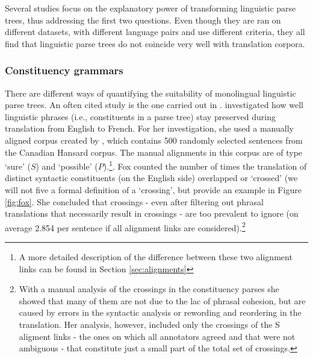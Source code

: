 \documentclass{report}
\theoremstyle{definition}
\theoremstyle{plain}
\begin{document}
Several studies focus on the explanatory power of transforming linguistic parse trees, thus addressing the first two questions. Even though they are ran on different datasets, with different language pairs and use different criteria, they all find that linguistic parse trees do not coincide very well with translation corpora.

\subsubsection{Constituency grammars}

There are different ways of quantifying the suitability of monolingual linguistic parse trees. An often cited study is the one carried out in \cite{fox2002phrasal}. \citeauthor{fox2002phrasal} investigated how well linguistic phrases (i.e., constituents in a parse tree) stay preserved during translation from English to French. For her investigation, she used a manually aligned corpus created by \cite{och2000improved}, which contains 500 randomly selected sentences from the Canadian Hansard corpus. The manual alignments in this corpus are of type `sure' ($S$) and `possible' ($P$).\footnote{A more detailed description of the difference between these two alignment links can be found in Section \ref{sec:alignments}}. Fox counted the number of times the translation of distinct syntactic constituents (on the English side) overlapped or `crossed' (we will not five a formal definition of a `crossing', but provide an example in Figure \ref{fig:fox}. She concluded that crossings - even after filtering out phrasal translations that necessarily result in crossings - are too prevalent to ignore (on average 2.854 per sentence if all alignment links are considered).\footnote{With a manual analysis of the crossings in the constituency parses she showed that many of them are not due to the lac of phrasal cohesion, but are caused by errors in the syntactic analysis or rewording and reordering in the translation. Her analysis, however, included only the crossings of the S aligment links - the ones on which all annotators agreed and that were not ambiguous - that constitute just a small part of the total set of crossings.}
\end{document}
